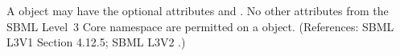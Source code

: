 A \ListOfEventAssignments object may have the optional attributes
 and .  No other attributes from the SBML
Level~3 Core namespace are permitted on a \ListOfEventAssignments object.
(References: SBML L3V1 Section 4.12.5; SBML L3V2 .)

